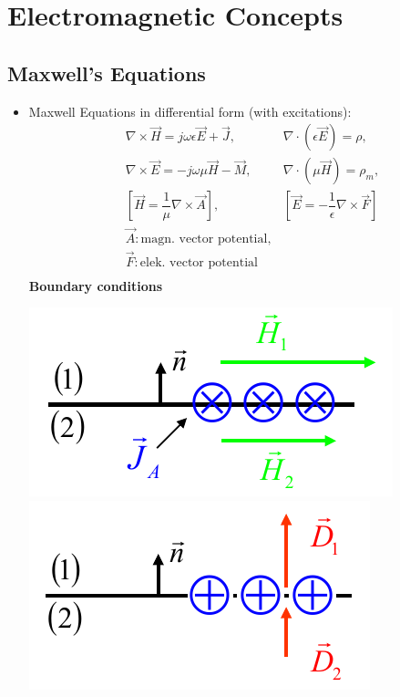 \section{Electromagnetic Concepts}
\subsection{Maxwell's Equations}
\begin{itemize}
    \itemsep0pt
    \item Maxwell Equations in differential form (with excitations):
        \begin{align*}
            &\nabla \times \vec{H} = j\omega\epsilon\vec{E} + \vec{J},\
            &\nabla \cdot \left(\epsilon\vec{E}\right) = \rho,\\
            &\nabla \times \vec{E} = -j\omega\mu\vec{H} - \vec{M},\
            &\nabla \cdot \left(\mu\vec{H}\right) = \rho_m,\\
            &\left[\vec{H} = \dfrac{1}{\mu} \nabla\times\vec{A}\right],\
            &\left[\vec{E} = -\dfrac{1}{\epsilon} \nabla\times\vec{F}\right]\\
            &\vec{A}:\text{magn. vector potential},\\
            &\vec{F}:\text{elek. vector potential}\\
        \end{align*}
        \textbf{Boundary conditions}\\
        \begin{minipage}{.25\paperheight}
            \centering
            \includegraphics[width=\textwidth]{content/aawp/pictures/EH_field_boundary_condition.png}
            \includegraphics[width=\textwidth]{content/aawp/pictures/BD_density_boundary_condition.png}

\end{minipage}
\end{itemize}
